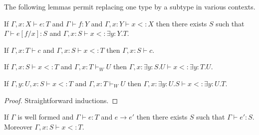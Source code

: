 The following lemmas permit replacing one type by a subtype in various contexts.

\begin{lem}\label{sub}
If $\Gamma,x:X\vdash e:T$ and $\Gamma\vdash f:Y$ and $\Gamma,x:Y\vdash x<:X$ then there exists $S$ such that $\Gamma\vdash e[f/x]:S$ and $\Gamma,x:S\vdash x<:\exists y:Y.T$.
\end{lem}

\begin{lem}\label{suc}
If $\Gamma,x:T\vdash c$ and $\Gamma,x:S\vdash x<:T$ then $\Gamma,x:S\vdash c$.
\end{lem}

\begin{lem}\label{sue}
If $\Gamma,x:S\vdash x<:T$ and $\Gamma,x:T\vdash_W U$ then $\Gamma, x:\exists y:S.U\vdash x<:\exists y:T.U$.
\end{lem}

\begin{lem}\label{sud}
If $\Gamma,y:U,x:S\vdash x<:T$ and $\Gamma,x:T\vdash_W U$ then $\Gamma, x:\exists y:U.S\vdash x<:\exists y:U.T$.
\end{lem}

\begin{proof}
Straightforward inductions.
\end{proof}


\begin{thm}\label{sr}
If $\Gamma$ is well formed and $\Gamma\vdash e:T$ and $e\rightarrow e'$ then there exists $S$ such that $\Gamma\vdash e':S$. Moreover $\Gamma,x:S\vdash x<:T$.
\end{thm}

